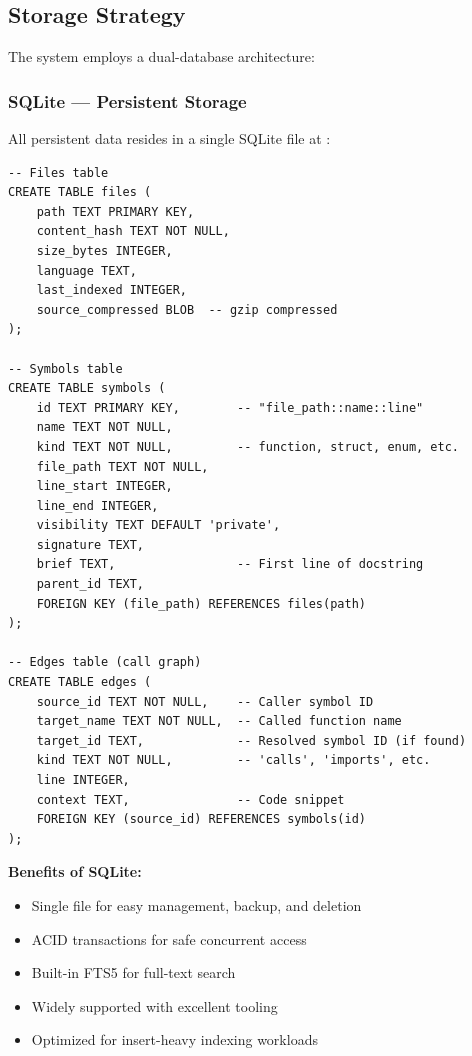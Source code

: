 \subsection{Storage Strategy}

The system employs a dual-database architecture:

\subsubsection{SQLite --- Persistent Storage}

All persistent data resides in a single SQLite file at :

\begin{lstlisting}[style=sqlcode, caption={Core database schema}]
-- Files table
CREATE TABLE files (
    path TEXT PRIMARY KEY,
    content_hash TEXT NOT NULL,
    size_bytes INTEGER,
    language TEXT,
    last_indexed INTEGER,
    source_compressed BLOB  -- gzip compressed
);

-- Symbols table
CREATE TABLE symbols (
    id TEXT PRIMARY KEY,        -- "file_path::name::line"
    name TEXT NOT NULL,
    kind TEXT NOT NULL,         -- function, struct, enum, etc.
    file_path TEXT NOT NULL,
    line_start INTEGER,
    line_end INTEGER,
    visibility TEXT DEFAULT 'private',
    signature TEXT,
    brief TEXT,                 -- First line of docstring
    parent_id TEXT,
    FOREIGN KEY (file_path) REFERENCES files(path)
);

-- Edges table (call graph)
CREATE TABLE edges (
    source_id TEXT NOT NULL,    -- Caller symbol ID
    target_name TEXT NOT NULL,  -- Called function name
    target_id TEXT,             -- Resolved symbol ID (if found)
    kind TEXT NOT NULL,         -- 'calls', 'imports', etc.
    line INTEGER,
    context TEXT,               -- Code snippet
    FOREIGN KEY (source_id) REFERENCES symbols(id)
);
\end{lstlisting}

\textbf{Benefits of SQLite:}
\begin{itemize}
    \item Single file for easy management, backup, and deletion
    \item ACID transactions for safe concurrent access
    \item Built-in FTS5 for full-text search
    \item Widely supported with excellent tooling
    \item Optimized for insert-heavy indexing workloads
\end{itemize}

